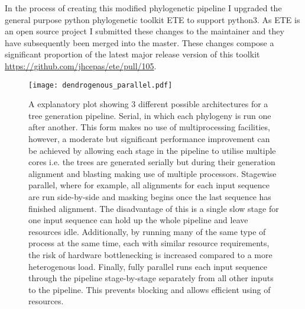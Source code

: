 In the process of creating this modified phylogenetic pipeline I upgraded the general purpose python phylogenetic toolkit
ETE \citep{Huerta-Cepas2010} to support python3.  As ETE is an open source project I submitted these changes
to the maintainer and they have subsequently been merged into the master.  These changes compose a significant proportion of
the latest major release version of this toolkit \url{https://github.com/jhcepas/ete/pull/105}.

\begin{figure}[h]
    \texttt{[image: dendrogenous\_parallel.pdf]}
    \caption{A explanatory plot showing 3 different possible architectures for a tree generation pipeline. 
        Serial, in which each phylogeny is run one after another.  This form makes no use of multiprocessing
        facilities, however, a moderate but significant performance improvement can be achieved by allowing
        each stage in the pipeline to utilise multiple cores i.e. the trees are generated serially but during
        their generation alignment and blasting making use of multiple processors.          
        Stagewise parallel, where for example, all alignments for each input sequence are run side-by-side 
        and masking begins once the last sequence has finished alignment.  The disadvantage of this is a single
        slow stage for one input sequence can hold up the whole pipeline and leave resources idle.  Additionally,
        by running many of the same type of process at the same time, each with similar resource requirements,
        the risk of hardware bottlenecking is increased compared to a more heterogenous load.
        Finally, fully parallel runs each input sequence through the pipeline stage-by-stage separately
    from all other inputs to the pipeline. This prevents blocking and allows efficient using of resources.}
    \label{fig:ddg}
\end{figure}

